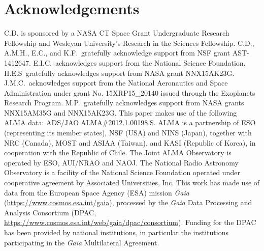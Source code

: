 \documentclass[modern]{aastex62}
\begin{document}
\section*{Acknowledgements}
C.D. is sponsored by a NASA CT Space Grant Undergraduate Research Fellowship and Wesleyan University's Research in the Sciences Fellowship.  
C.D., A.M.H., E.C., and K.F.~gratefully acknowledge support from NSF grant AST-1412647.  
E.I.C.~acknowledges support from the National Science Foundation.
H.E.S~gratefully acknowledges support from NASA grant NNX15AK23G.
J.M.C.~acknowledges support from the National Aeronautics and Space Administration under grant No. 15XRP15\_20140 issued through the Exoplanets Research Program.
M.P.~gratefully acknowledges support from NASA grants NNX15AM35G and NNX15AK23G.
This paper makes use of the following ALMA data:  ADS/JAO.ALMA\#2012.1.00198.S.  
ALMA is a partnership of ESO (representing its member states), NSF (USA) and NINS (Japan), together with NRC (Canada), MOST and ASIAA (Taiwan), and KASI (Republic of Korea), in cooperation with the Republic of Chile.  
The Joint ALMA Observatory is operated by ESO, AUI/NRAO and NAOJ.  
The National Radio Astronomy Observatory is a facility of the National Science Foundation operated under cooperative agreement by Associated Universities, Inc.
This work has made use of data from the European Space Agency (ESA) mission {\it Gaia} (\url{https://www.cosmos.esa.int/gaia}), processed by the {\it Gaia}
Data Processing and Analysis Consortium (DPAC, \url{https://www.cosmos.esa.int/web/gaia/dpac/consortium}). 
Funding for the DPAC has been provided by national institutions, in particular the institutions participating in the {\it Gaia} Multilateral Agreement.

\clearpage

% 
\end{document}
